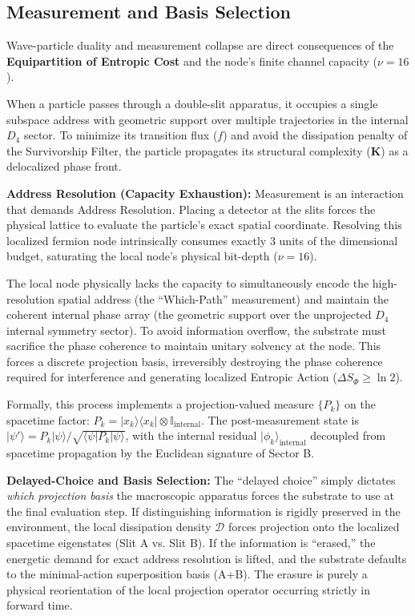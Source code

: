 \subsection{Measurement and Basis Selection}
\label{subsec:measurement}

Wave-particle duality and measurement collapse are direct consequences of the \textbf{Equipartition of Entropic Cost} and the node's finite channel capacity ($\nu = 16$).

When a particle passes through a double-slit apparatus, it occupies a single subspace address with geometric support over multiple trajectories in the internal $D_4$ sector. To minimize its transition flux ($f$) and avoid the dissipation penalty of the Survivorship Filter, the particle propagates its structural complexity ($\mathbf{K}$) as a delocalized phase front. 

\textbf{Address Resolution (Capacity Exhaustion):} Measurement is an interaction that demands Address Resolution. Placing a detector at the slits forces the physical lattice to evaluate the particle's exact spatial coordinate. Resolving this localized fermion node intrinsically consumes exactly 3 units of the dimensional budget, saturating the local node's physical bit-depth ($\nu = 16$). 

The local node physically lacks the capacity to simultaneously encode the high-resolution spatial address (the ``Which-Path'' measurement) and maintain the coherent internal phase array (the geometric support over the unprojected $D_4$ internal symmetry sector). To avoid information overflow, the substrate must sacrifice the phase coherence to maintain unitary solvency at the node. This forces a discrete projection basis, irreversibly destroying the phase coherence required for interference and generating localized Entropic Action ($\Delta S_\Phi \ge \ln 2$).

Formally, this process implements a projection-valued measure $\{P_k\}$ on the spacetime factor: $P_k = |x_k\rangle\langle x_k| \otimes \mathbb{I}_{\text{internal}}$. The post-measurement state is $|\psi'\rangle = P_k |\psi\rangle / \sqrt{\langle\psi|P_k|\psi\rangle}$, with the internal residual $|\phi_k\rangle_{\text{internal}}$ decoupled from spacetime propagation by the Euclidean signature of Sector B.

\textbf{Delayed-Choice and Basis Selection:} The ``delayed choice'' simply dictates \textit{which projection basis} the macroscopic apparatus forces the substrate to use at the final evaluation step. If distinguishing information is rigidly preserved in the environment, the local dissipation density $\mathcal{D}$ forces projection onto the localized spacetime eigenstates (Slit A vs. Slit B). If the information is ``erased,'' the energetic demand for exact address resolution is lifted, and the substrate defaults to the minimal-action superposition basis (A+B). The erasure is purely a physical reorientation of the local projection operator occurring strictly in forward time.